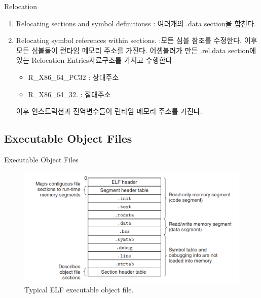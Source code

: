 \documentclass[10pt]{beamer}
\begin{document}
\begin{frame}{Relocation}
    \begin{enumerate}
        \item Relocating sections and symbol definitionss :  여러개의 .data section을 합친다.
        \item Relocating symbol references within sections. :모든 심볼 참조를 수정한다. 이후  
        모든 심볼들이 런타임 메모리 주소를 가진다. 어셈블러가 만든 .rel.data section에 있는 Relocation Entries자료구조를 가지고 수행한다
        \begin{itemize}
            \item R\_X86\_64\_PC32 : 상대주소
            \item R\_X86\_64\_32. : 절대주소
        \end{itemize}
         이후 인스트럭션과 전역변수들이 런타임 메모리 주소를 가진다.
    \end{enumerate}
\end{frame} 

\subsection{Executable Object Files}

\begin{frame}{Executable Object Files}
    \begin{figure}[h!]
        \includegraphics[scale=0.25]{pic4}
        \caption{Typical ELF executable object file.}
    \end{figure}
\end{frame}    
\end{document}
